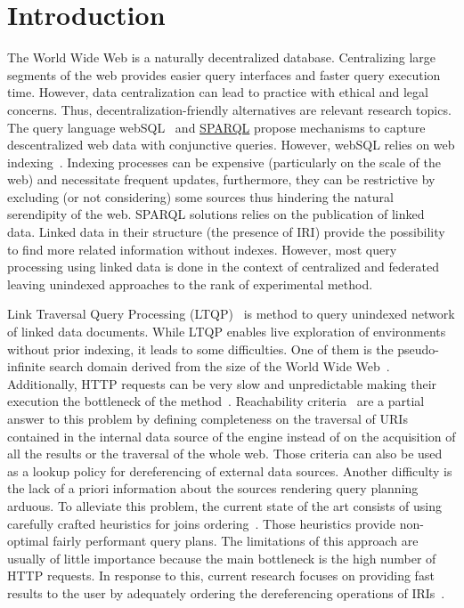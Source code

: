 \section{Introduction}

The World Wide Web is a naturally decentralized database.
Centralizing large segments of the web provides easier query interfaces and faster query execution time.
However, data centralization can lead to practice with ethical and legal concerns.
Thus, decentralization-friendly alternatives are relevant research topics.
The query language webSQL~\cite{Mendelzon1996} and \href{https://www.w3.org/TR/sparql11-query/}{SPARQL} propose mechanisms to capture descentralized web data with conjunctive queries.
However, webSQL relies on web indexing~\cite{Mendelzon1996}.
Indexing processes can be expensive (particularly on the scale of the web) and necessitate frequent updates, furthermore, they can be restrictive by excluding (or not considering) some sources thus hindering the natural serendipity of the web.
SPARQL solutions relies on the publication of linked data.
Linked data in their structure (the presence of IRI) provide the possibility to find more related information without indexes.
However, most query processing using linked data is done in the context of centralized and federated leaving unindexed approaches to the rank of experimental method. 

Link Traversal Query Processing (LTQP)~\cite{Hartig2012} is method to query unindexed network of linked data documents.
While LTQP enables live exploration of environments without prior indexing, it leads to some difficulties.
One of them is the pseudo-infinite search domain derived from the size of the World Wide Web~\cite{hartig2016walking}.
Additionally, HTTP requests can be very slow and unpredictable making their execution the bottleneck of the method~\cite{hartig2016walking}.
Reachability criteria~\cite{Hartig2012} are a partial answer to this problem by defining completeness on the traversal of URIs
contained in the internal data source of the engine instead of on the acquisition of all the results or the traversal of the whole web.
Those criteria can also be used as a lookup policy for dereferencing of external data sources.
Another difficulty is the lack of a priori information about the sources rendering query planning arduous.
To alleviate this problem, the current state of the art consists of using carefully crafted heuristics for joins ordering~\cite{Hartig2011}.
Those heuristics provide non-optimal fairly performant query plans.
The limitations of this approach are usually of little importance because the main bottleneck is the high number of HTTP requests.
In response to this, current research focuses on providing fast results to the user by adequately ordering the dereferencing operations of IRIs~\cite{hartig2016walking}.

